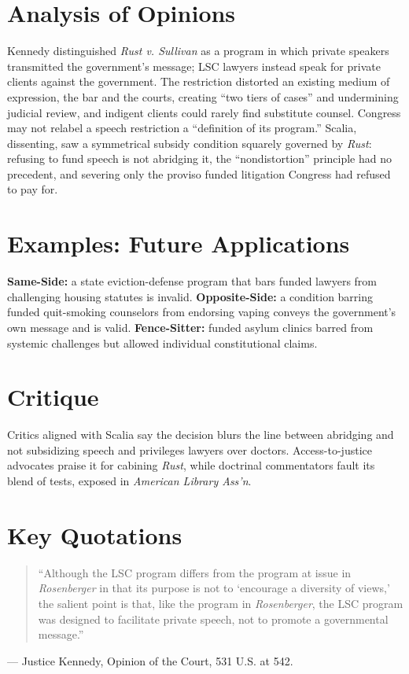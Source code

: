 \documentclass[12pt]{article}
\begin{document}
\section{Analysis of Opinions}
Kennedy distinguished \textit{Rust v. Sullivan} as a program in which private speakers transmitted the government's message; LSC lawyers instead speak for private clients against the government. The restriction distorted an existing medium of expression, the bar and the courts, creating ``two tiers of cases'' and undermining judicial review, and indigent clients could rarely find substitute counsel. Congress may not relabel a speech restriction a ``definition of its program.'' Scalia, dissenting, saw a symmetrical subsidy condition squarely governed by \textit{Rust}: refusing to fund speech is not abridging it, the ``nondistortion'' principle had no precedent, and severing only the proviso funded litigation Congress had refused to pay for.

\section{Examples: Future Applications}
\textbf{Same-Side:} a state eviction-defense program that bars funded lawyers from challenging housing statutes is invalid. \textbf{Opposite-Side:} a condition barring funded quit-smoking counselors from endorsing vaping conveys the government's own message and is valid. \textbf{Fence-Sitter:} funded asylum clinics barred from systemic challenges but allowed individual constitutional claims.

\section{Critique}
Critics aligned with Scalia say the decision blurs the line between abridging and not subsidizing speech and privileges lawyers over doctors. Access-to-justice advocates praise it for cabining \textit{Rust}, while doctrinal commentators fault its blend of tests, exposed in \textit{American Library Ass'n}.

\section{Key Quotations}
\begin{quote}
``Although the LSC program differs from the program at issue in \textit{Rosenberger} in that its purpose is not to `encourage a diversity of views,' the salient point is that, like the program in \textit{Rosenberger}, the LSC program was designed to facilitate private speech, not to promote a governmental message.''
\end{quote}
\noindent --- Justice Kennedy, Opinion of the Court, 531 U.S. at 542.
\end{document}
